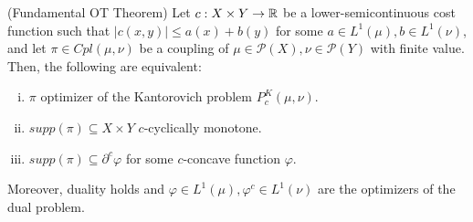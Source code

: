 \documentclass[../main.tex]{subfiles}
\begin{document}
\begin{theorem}
    \label{thm:fundamental_OT}
    (Fundamental OT Theorem) 
    Let $c: X \times Y \to \mathbb{R}$ be a lower-semicontinuous cost function such that $|c(x, y)| \leq a(x) + b(y)$ for some $a\in L^1(\mu), b\in L^1(\nu)$, and let $\pi\in Cpl(\mu, \nu)$ be a coupling of $\mu\in \mathcal{P}(X), \nu\in\mathcal{P}(Y)$ with finite value. \\
    Then, the following are equivalent:
    \begin{enumerate}[(i)]
        \item $\pi$ optimizer of the Kantorovich problem $P^K_c(\mu, \nu)$.
        \item $supp(\pi)\subseteq X\times Y$ $c$-cyclically monotone.
        \item $supp(\pi)\subseteq \partial^c \varphi$ for some $c$-concave function $\varphi$.
    \end{enumerate}
    Moreover, duality holds and $\varphi\in L^1(\mu), \varphi^c\in L^1(\nu)$ are the optimizers of the dual problem.
\end{theorem}
\end{document}

